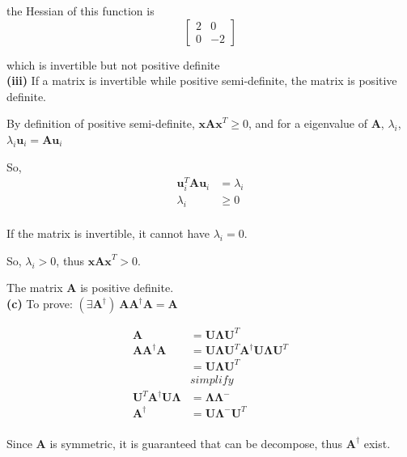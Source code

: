 \documentclass[11pt]{article}
\begin{document}
the Hessian of this function is\\

$$\begin{bmatrix}
2&0\\0&-2
\end{bmatrix}
$$

which is invertible but not positive definite\\

\pagebreak
\textbf{(iii)}
If a matrix is invertible while positive semi-definite, the matrix is positive definite.

By definition of positive semi-definite, $\textbf{xAx}^T\ge 0$, and for a eigenvalue of $\textbf{A}$, $\lambda_i$, $\lambda_i\textbf{u}_i=\textbf{Au}_i$ 

So, 
\begin{equation} \label{eq7}
\begin{split}
\textbf{u}_i^T\textbf{A}\textbf{u}_i&=\lambda_i\\
\lambda_i&\ge 0\\
\end{split}
\end{equation}

If the matrix is invertible, it cannot have $\lambda_i = 0$.

So, $\lambda_i>0$, thus $\textbf{xAx}^T>0$.

The matrix \textbf{A} is positive definite.\\

\noindent\textbf{(c)}
To prove: $(\exists \textbf{A}^\dagger)\ \textbf{AA}^\dagger \textbf{A} = \textbf{A}$

\begin{equation} \label{eq8}
\begin{split}
\textbf{A}&=\textbf{U}\pmb{\Lambda}\textbf{U}^T\\
\textbf{AA}^\dagger \textbf{A}&=\textbf{U}\pmb{\Lambda}\textbf{U}^T\textbf{A}^\dagger\textbf{U}\pmb{\Lambda}\textbf{U}^T\\
&=\textbf{U}\pmb{\Lambda}\textbf{U}^T\\
&simplify\\
\textbf{U}^T\textbf{A}^\dagger\textbf{U}\pmb{\Lambda}&=\pmb{\Lambda}\pmb{\Lambda}^-\\
\textbf{A}^\dagger&=\textbf{U}\pmb{\Lambda}^{-}\textbf{U}^T\\
\end{split}
\end{equation}

Since \textbf{A} is symmetric, it is guaranteed that can be decompose,
thus $\textbf{A}^\dagger$ exist.
\end{document}
